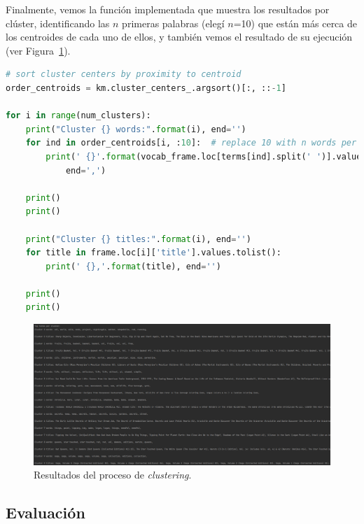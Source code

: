 \documentclass{uimppracticas}
\begin{document}
Finalmente, vemos la función implementada que muestra los resultados por clúster, identificando las $n$ primeras palabras (elegí $n$=10) que están más cerca de los centroides de cada uno de ellos, y también vemos el resultado de su ejecución (ver Figura~\ref{results}). 

\begin{lstlisting}[language=python]
# sort cluster centers by proximity to centroid	
order_centroids = km.cluster_centers_.argsort()[:, ::-1] 

for i in range(num_clusters):
	print("Cluster {} words:".format(i), end='')
	for ind in order_centroids[i, :10]:  # replace 10 with n words per cluster
		print(' {}'.format(vocab_frame.loc[terms[ind].split(' ')].values.tolist()[0][0]), 
			end=',')
	
	print()
	print()
	
	print("Cluster {} titles:".format(i), end='')
	for title in frame.loc[i]['title'].values.tolist():
		print(' {},'.format(title), end='')
	
	print()
	print()
\end{lstlisting}

\begin{figure}
	\centering
	\includegraphics[scale=0.35]{images/results}
	\caption{Resultados del proceso de \textit{clustering}.}
	\label{results}
\end{figure}

\subsection{Evaluación}


\renewcommand{\refname}{Bibliografía}


\end{document}
